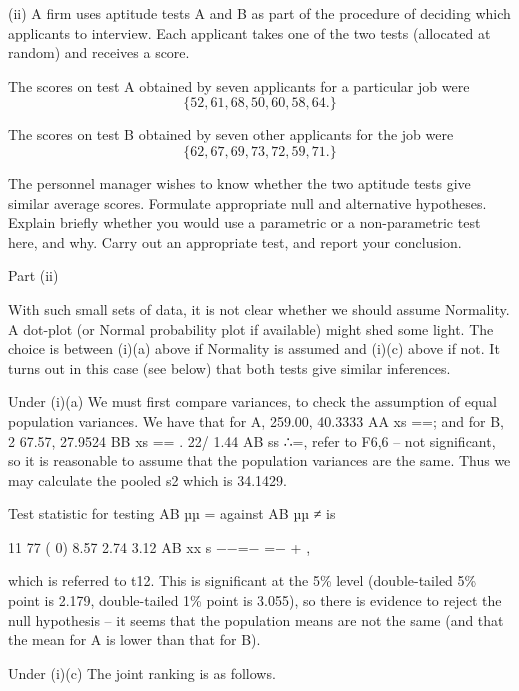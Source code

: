 \documentclass[a4paper,12pt]{article}
\begin{document}
\begin{enumerate}[(a)]
 
\newpage

\begin{framed}
(ii) A firm uses aptitude tests A and B as part of the procedure of deciding which applicants to interview.  Each applicant takes one of the two tests (allocated at random) and receives a score. 
 
The scores on test A obtained by seven applicants for a particular job were 
\[\{ 52,  61,  68,  50,  60,  58,  64. \}\]
 
The scores on test B obtained by seven other applicants for the job were 
 \[\{62,  67,  69,  73,  72,  59,  71.  \}\]
 
The personnel manager wishes to know whether the two aptitude tests give similar average scores.  Formulate appropriate null and alternative hypotheses.  Explain briefly whether you would use a parametric or a non-parametric test here, and why.  Carry out an appropriate test, and report your conclusion.  
 
 
\end{framed} 
 
Part (ii) 
 
With such small sets of data, it is not clear whether we should assume Normality.  A dot-plot (or Normal probability plot if available) might shed some light.  The choice is between (i)(a) above if Normality is assumed and (i)(c) above if not.  It turns out in this case (see below) that both tests give similar inferences. 
 
Under (i)(a) 
 We must first compare variances, to check the assumption of equal population variances.  We have that for A, 259.00, 40.3333 AA xs ==;  and for B, 2 67.57, 27.9524 BB xs == .  22/ 1.44 AB ss ∴=,  refer to F6,6  –  not significant, so it is reasonable to assume that the population variances are the same. 
 Thus we may calculate the pooled s2 which is 34.1429. 
 
Test statistic for testing AB µµ = against AB µµ ≠ is 
 
11 77 ( 0) 8.57 2.74 3.12 AB xx s −−=− =− +
, 
 
which is referred to t12.  This is significant at the 5\% level (double-tailed 5\% point is 2.179, double-tailed 1\% point is 3.055), so there is evidence to reject the null hypothesis  –  it seems that the population means are not the same (and that the mean for A is lower than that for B). 
 
Under (i)(c) 
 The joint ranking is as follows. 
 

\end{enumerate}
\end{document}
